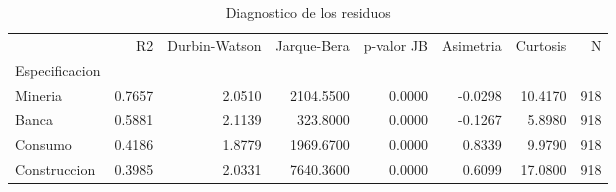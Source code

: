 \begin{table}
\caption{Diagnostico de los residuos}
\label{tab:tabla7_diagnostico}
\begin{tabular}{lrrrrrrr}
\toprule
 & R2 & Durbin-Watson & Jarque-Bera & p-valor JB & Asimetria & Curtosis & N \\
Especificacion &  &  &  &  &  &  &  \\
\midrule
Mineria & 0.7657 & 2.0510 & 2104.5500 & 0.0000 & -0.0298 & 10.4170 & 918 \\
Banca & 0.5881 & 2.1139 & 323.8000 & 0.0000 & -0.1267 & 5.8980 & 918 \\
Consumo & 0.4186 & 1.8779 & 1969.6700 & 0.0000 & 0.8339 & 9.9790 & 918 \\
Construccion & 0.3985 & 2.0331 & 7640.3600 & 0.0000 & 0.6099 & 17.0800 & 918 \\
\bottomrule
\end{tabular}
\end{table}
